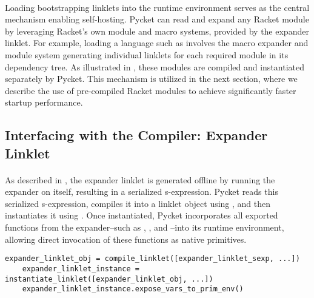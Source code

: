 
		\paragraph{}%
			Loading bootstrapping linklets into the runtime environment serves as the central mechanism enabling self-hosting. Pycket can read and expand any Racket module by leveraging Racket's own module and macro systems, provided by the expander linklet. For example, loading a language such as  involves the macro expander and module system generating individual linklets for each required module in its dependency tree. As illustrated in , these modules are compiled and instantiated separately by Pycket. This mechanism is utilized in the next section, where we describe the use of pre-compiled Racket modules to achieve significantly faster startup performance.

		\subsection{Interfacing with the Compiler: Expander Linklet}

			\paragraph{}%
				As described in , the expander linklet is generated offline by running the expander on itself, resulting in a serialized s-expression. Pycket reads this serialized s-expression, compiles it into a linklet object using , and then instantiates it using . Once instantiated, Pycket incorporates all exported functions from the expander--such as , , and --into its runtime environment, allowing direct invocation of these functions as native primitives.

			\begin{center}
				\begin{minipage}{0.7\textwidth}
					\begin{lstlisting}[style=inline-python,frame=lines,numbers=none]
	expander_linklet_obj = compile_linklet([expander_linklet_sexp, ...])
	expander_linklet_instance = instantiate_linklet([expander_linklet_obj, ...])
	expander_linklet_instance.expose_vars_to_prim_env()\end{lstlisting}
				\end{minipage}
			\end{center}

